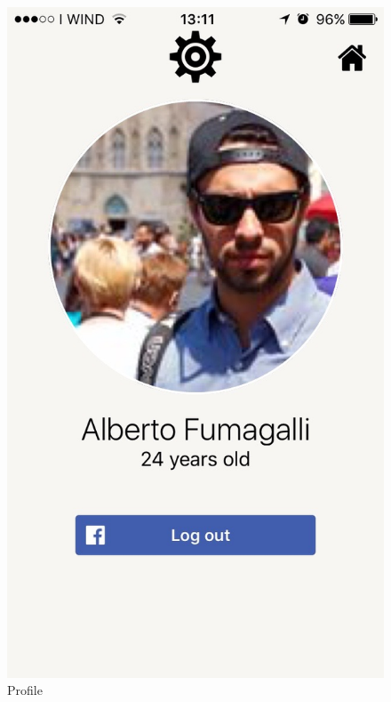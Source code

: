 \begin{multicols}{2}
\begin{figure}[H]
\centering
\centering
\includegraphics[scale=0.15]{./images/profile.jpg}
\caption{\label{Expo Map}Profile}
\end{figure}


\end{multicols}
